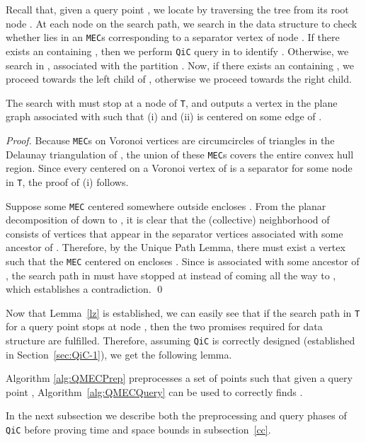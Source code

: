 \documentclass[12pt]{llncs}
\begin{document}
Recall that,
given a query point , we locate  by traversing the tree  from its root 
node . At each node  on the search path, we search in the  data 
structure 
to check whether  lies in an {\tt MEC}s corresponding to a separator vertex of 
node .
If there exists an  containing , then we perform {\tt QiC} 
query in  to identify .   
Otherwise,  we search  in , 
associated with the partition . Now, if there exists an  containing , we proceed towards the left child of , otherwise we proceed 
towards the right child.
\begin{lemma}\label{lz}
The search with  must stop at a node  of {\tt T}, and outputs a vertex  in the plane graph  associated with  such that (i)  and (ii)  is centered on some edge of .
\end{lemma}
\begin{proof}
Because {\tt MEC}s on Voronoi vertices are circumcircles of triangles in the Delaunay triangulation of ,  the union of these {\tt MEC}s covers the entire convex hull region. Since every  centered on a Voronoi vertex of  is a separator for some node in {\tt T}, the proof of (i) follows. 

Suppose some {\tt MEC}  centered somewhere outside  encloses .
From the planar decomposition of  down to , it is clear that the (collective) neighborhood  of  consists of vertices that appear in the separator vertices associated with some ancestor of . Therefore, by the Unique Path Lemma, there must exist a vertex  such that the {\tt MEC} centered on  encloses . Since  is associated with some ancestor  of , the search path in  must have stopped at   instead of coming all the way to , which establishes a contradiction.
\qed
\end{proof}

Now that Lemma\ \ref{lz} is established, we can easily see that if the search path in {\tt T} for a query point  stops at node , then the two promises required for  data structure are fulfilled. Therefore, assuming {\tt QiC} is correctly designed (established in Section\ \ref{sec:QiC-1}), we get the following lemma. 
\begin{lemma}\label{lem:qmeccorrect}
Algorithm \ref{alg:QMECPrep} preprocesses a set  of points such that given a query point , Algorithm\ \ref{alg:QMECQuery} can be used to correctly finds .
\end{lemma}
In the next subsection we describe both the preprocessing and query phases of {\tt QiC} before proving time and space bounds in subsection\ \ref{cc}. 
\end{document}
